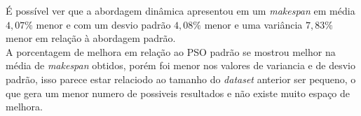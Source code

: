 \begin{table}[!htb]
    \centering
    \caption{Tabela de dados estatísticos da execução do problema B}
    \label{tab:tableB-freq-mk}
\end{table}
É possível ver que a abordagem dinâmica 
apresentou em 
um \textit{makespan} em média $4,07\%$ menor e com um
desvio padrão $4,08\%$ menor e uma
variância $7,83\%$ menor
em relação à abordagem padrão.\\
A porcentagem de melhora em relação ao PSO padrão se mostrou melhor na média de \textit{makespan} obtidos, porém foi menor nos valores de variancia e de desvio padrão, isso parece estar relaciodo ao tamanho do \textit{dataset} anterior ser pequeno, o que gera um menor numero de possiveis resultados e não existe muito espaço de melhora.



